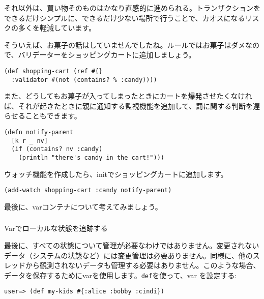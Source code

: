 それ以外は、買い物そのものはかなり直感的に進められる。トランザクションをできるだけシンプルに、できるだけ少ない場所で行うことで、カオスになるリスクの多くを軽減しています。

そういえば、お菓子の話はしていませんでしたね。ルールではお菓子はダメなので、バリデーターをショッピングカートに追加しましょう。


\begin{lstlisting}[numbers=none]
(def shopping-cart (ref #{}
  :validator #(not (contains? % :candy))))
\end{lstlisting}

また、どうしてもお菓子が入ってしまったときにカートを爆発させたくなければ、それが起きたときに親に通知する監視機能を追加して、罰に関する判断を遅らせることもできます。


\begin{lstlisting}[numbers=none]
(defn notify-parent
  [k r _ nv]
  (if (contains? nv :candy)
    (println "there's candy in the cart!")))
\end{lstlisting}

ウォッチ機能を作成したら、initでショッピングカートに追加します。


\begin{lstlisting}[numbers=none]
(add-watch shopping-cart :candy notify-parent)
\end{lstlisting}

最後に、varコンテナについて考えてみましょう。





\subsubsection{}Varでローカルな状態を追跡する

最後に、すべての状態について管理が必要なわけではありません。変更されないデータ（システムの状態など）には変更管理は必要ありません。同様に、他のスレッドから観測されないデータも管理する必要はありません。このような場合、データを保存するためにvarを使用します。\texttt{def}を使って、var を設定する:


\begin{lstlisting}[numbers=none]
user=> (def my-kids #{:alice :bobby :cindi})
\end{lstlisting}


